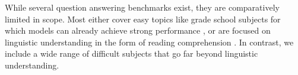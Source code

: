 While several question answering benchmarks exist, they are comparatively limited in scope. Most either cover easy topics like grade school subjects for which models can already achieve strong performance \citep{Clark2018ARCAI2, khot2019qasc, OpenBookQA2018,Clark2019RegentsScienceExams}, or are focused on linguistic understanding in the form of reading comprehension \citep{lai2017race, richardson-etal-2013-mctest}. In contrast, we include a wide range of difficult subjects that go far beyond linguistic understanding.




